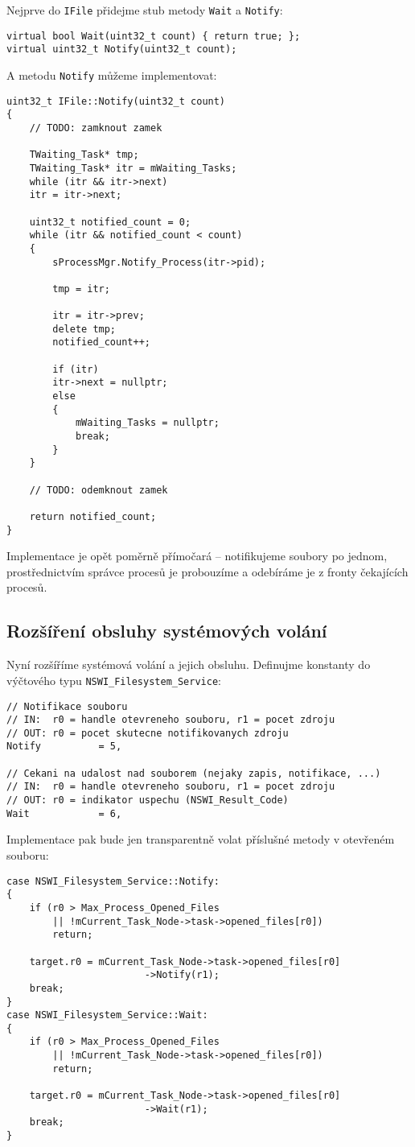 \documentclass{article}
\begin{document}
Nejprve do \texttt{IFile} přidejme stub metody \texttt{Wait} a \texttt{Notify}:
\begin{lstlisting}
virtual bool Wait(uint32_t count) { return true; };
virtual uint32_t Notify(uint32_t count);
\end{lstlisting}

A metodu \texttt{Notify} můžeme implementovat:
\begin{lstlisting}
uint32_t IFile::Notify(uint32_t count)
{
    // TODO: zamknout zamek
	
	TWaiting_Task* tmp;
	TWaiting_Task* itr = mWaiting_Tasks;
	while (itr && itr->next)
	itr = itr->next;
	
	uint32_t notified_count = 0;
	while (itr && notified_count < count)
	{
		sProcessMgr.Notify_Process(itr->pid);
		
		tmp = itr;
		
		itr = itr->prev;
		delete tmp;
		notified_count++;
		
		if (itr)
		itr->next = nullptr;
		else
		{
			mWaiting_Tasks = nullptr;
			break;
		}
	}
	
    // TODO: odemknout zamek
	
	return notified_count;
}
\end{lstlisting}
Implementace je opět poměrně přímočará -- notifikujeme soubory po jednom, prostřednictvím správce procesů je probouzíme a odebíráme je z fronty čekajících procesů.

\subsection{Rozšíření obsluhy systémových volání}

Nyní rozšíříme systémová volání a jejich obsluhu. Definujme konstanty do výčtového typu \texttt{NSWI\_Filesystem\_Service}:
\begin{lstlisting}
// Notifikace souboru
// IN:  r0 = handle otevreneho souboru, r1 = pocet zdroju
// OUT: r0 = pocet skutecne notifikovanych zdroju
Notify          = 5,

// Cekani na udalost nad souborem (nejaky zapis, notifikace, ...)
// IN:  r0 = handle otevreneho souboru, r1 = pocet zdroju
// OUT: r0 = indikator uspechu (NSWI_Result_Code)
Wait            = 6,
\end{lstlisting}

Implementace pak bude jen transparentně volat příslušné metody v otevřeném souboru:
\begin{lstlisting}
case NSWI_Filesystem_Service::Notify:
{
	if (r0 > Max_Process_Opened_Files
	    || !mCurrent_Task_Node->task->opened_files[r0])
		return;
	
	target.r0 = mCurrent_Task_Node->task->opened_files[r0]
	                    ->Notify(r1);
	break;
}
case NSWI_Filesystem_Service::Wait:
{
	if (r0 > Max_Process_Opened_Files
	    || !mCurrent_Task_Node->task->opened_files[r0])
		return;
	
	target.r0 = mCurrent_Task_Node->task->opened_files[r0]
	                    ->Wait(r1);
	break;
}
\end{lstlisting}
\end{document}
